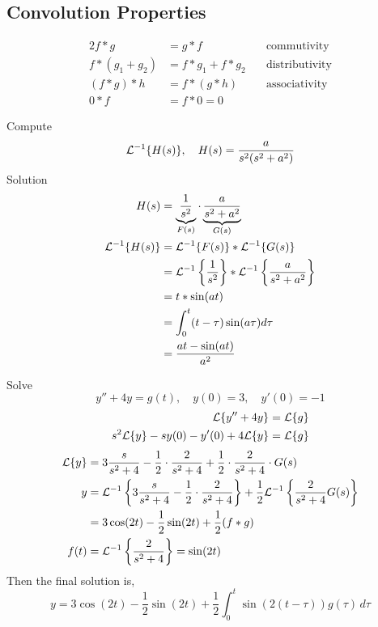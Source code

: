 \documentclass[diffeq.tex]{subfiles}
\begin{document}
    \subsection{Convolution Properties}
    \begin{alignat}{2}
        f * g &= g * f & \quad\text{commutivity}\\
        f * (g_{1} + g_{2}) &= f * g_{1} + f * g_{2} & \quad\text{distributivity}\\
        (f * g) * h &= f * (g * h) & \quad\text{associativity}\\
        0 * f &= f * 0 = 0&
    \end{alignat}
    \begin{example}
        Compute
        \begin{equation}
            \mathcal{L}^{-1}\{H(s)\},\quad H(s) = \frac{a}{s^{2}(s^{2} + a^{2})}
        \end{equation}
        Solution
        \begin{alignat}{1}
            H(s) &= \underbrace{\frac{1}{s^{2}}}_{F(s)} \cdot \underbrace{\frac{a}{s^{2} + a^{2}}}_{G(s)}\\
            \mathcal{L}^{-1}\{H(s)\} &= \mathcal{L}^{-1}\{F(s)\} * \mathcal{L}^{-1}\{G(s)\}\\
            &= \mathcal{L}^{-1}\left\{\frac{1}{s^{2}}\right\}*\mathcal{L}^{-1}\left\{\frac{a}{s^{2} + a^{2}}\right\}\\
            &= t * \sin(at)\\
            &= \int_{0}^{t}(t-\tau)\sin(a\tau)d\tau\\
            &= \frac{at-\sin(at)}{a^{2}}
        \end{alignat}
    \end{example}
    \begin{example}
        Solve
        \begin{equation}
            y'' + 4y = g(t),\quad y(0) = 3,\quad y'(0) = -1
        \end{equation}
        \begin{alignat}{1}
            \mathcal{L}\{y'' + 4y\} &= \mathcal{L}\{g\}\\
            s^{2}\mathcal{L}\{y\} - sy(0) - y'(0) + 4\mathcal{L}\{y\} &= \mathcal{L}\{g\}
        \end{alignat}
        \begin{alignat}{1}
            \mathcal{L}\{y\} &= 3\frac{s}{s^{2} + 4} - \frac{1}{2}\cdot\frac{2}{s^{2} + 4} + \frac{1}{2} \cdot \frac{2}{s^{2} + 4} \cdot G(s)\\
            y &= \mathcal{L}^{-1}\left\{3\frac{s}{s^{2} + 4} - \frac{1}{2}\cdot\frac{2}{s^{2} + 4}\right\} + \frac{1}{2}\mathcal{L}^{-1}\left\{\frac{2}{s^{2} + 4}G(s)\right\}\\
            &= 3\cos(2t)-\frac{1}{2}\sin(2t)+\frac{1}{2}(f * g)\\
            f(t) &= \mathcal{L}^{-1}\left\{\frac{2}{s^{2} + 4}\right\} = \sin(2t)
        \end{alignat}
        Then the final solution is,
        \begin{equation}
            y = 3\cos(2t) - \frac{1}{2}\sin(2t) + \frac{1}{2}\int_{0}^{t}\sin(2(t - \tau))g(\tau)\,d\tau
        \end{equation}
    \end{example}
\end{document}
